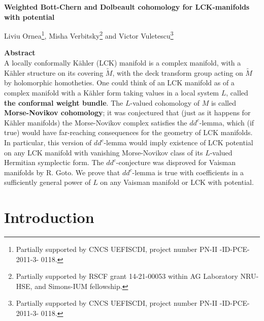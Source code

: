 \documentclass[11pt]{article}
\numberwithin{equation}{section}
\newcommand{\6}{\partial}
\renewcommand{\tilde}{\widetilde}
\newcounter{lemma}[section]
\newcounter{conjecture}[section]
\begin{document}
\begin{center}
{\LARGE\bf Weighted Bott-Chern and Dolbeault cohomology
 for LCK-manifolds with potential \\[3mm]
}

Liviu Ornea\footnote{\label{LO}Partially supported by CNCS UEFISCDI, project number PN-II
-ID-PCE-2011-3-
0118.}, Misha Verbitsky\footnote{Partially supported by RSCF grant 14-21-00053 within AG Laboratory NRU-HSE, and Simons-IUM fellowship.} and Victor Vuletescu\footnote{Partially supported by CNCS UEFISCDI, project number PN-II
-ID-PCE-2011-3-
0118.}


\end{center}

{\small
\hspace{0.15\linewidth}
\begin{minipage}[t]{0.7\linewidth}
{\bf Abstract} \\
A locally conformally K\"ahler (LCK) manifold is a 
complex manifold, with a K\"ahler structure on its
covering $\tilde M$, with the deck transform group acting
on $\tilde M$ by holomorphic homotheties.
One could think of an LCK manifold as of a 
complex manifold with a K\"ahler form taking
values in a local system $L$, called {\bf the conformal 
weight bundle}. The $L$-valued cohomology of $M$
is called {\bf Morse-Novikov cohomology}; it was
conjectured that (just as it happens for K\"ahler
manifolds) the Morse-Novikov complex satisfies
the $dd^c$-lemma, which (if true) would have far-reaching
consequences for the geometry of LCK manifolds. 
In particular, this version of $dd^c$-lemma would 
imply existence of LCK potential on any LCK manifold with
vanishing Morse-Novikov class of its 
$L$-valued Hermitian symplectic form. The 
$dd^c$-conjecture was disproved for Vaisman manifolds 
by R. Goto. We prove that $dd^c$-lemma is true
with coefficients in a sufficiently general power of $L$
on any Vaisman manifold or LCK with potential.  
\end{minipage}
}


\tableofcontents




\section{Introduction}
\end{document}
